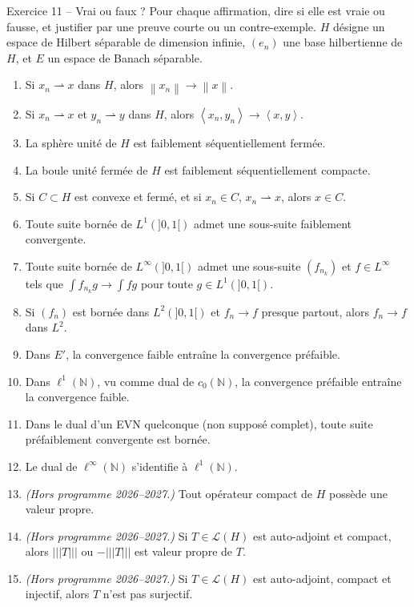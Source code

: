 \documentclass[11pt,a4paper]{article}
\newcommand{\N}{\mathbb{N}}
\newcommand{\norm}[1]{\left\|#1\right\|}
\newcommand{\opnorm}[1]{|\!|\!|#1|\!|\!|}
\newcommand{\ps}[2]{\left\langle #1,#2\right\rangle}
\newcommand{\Lc}{\mathcal{L}}
\newcommand{\wk}{\rightharpoonup}
\theoremstyle{definition}
\begin{document}
\begin{exo}{Exercice 11 -- Vrai ou faux ?}
Pour chaque affirmation, dire si elle est vraie ou fausse, et justifier par une preuve courte ou un contre-exemple. $H$ désigne un espace de Hilbert séparable de dimension infinie, $(e_n)$ une base hilbertienne de $H$, et $E$ un espace de Banach séparable.
\begin{enumerate}[label=\arabic*.]
  \item Si $x_n\wk x$ dans $H$, alors $\norm{x_n}\to\norm x$.
  \item Si $x_n\wk x$ et $y_n\wk y$ dans $H$, alors $\ps{x_n}{y_n}\to\ps xy$.
  \item La sphère unité de $H$ est faiblement séquentiellement fermée.
  \item La boule unité fermée de $H$ est faiblement séquentiellement compacte.
  \item Si $C\subset H$ est convexe et fermé, et si $x_n\in C$, $x_n\wk x$, alors $x\in C$.
  \item Toute suite bornée de $L^1(]0,1[)$ admet une sous-suite faiblement convergente.
  \item Toute suite bornée de $L^\infty(]0,1[)$ admet une sous-suite $(f_{n_k})$ et $f\in L^\infty$ tels que $\int f_{n_k}g\to\int fg$ pour toute $g\in L^1(]0,1[)$.
  \item Si $(f_n)$ est bornée dans $L^2(]0,1[)$ et $f_n\to f$ presque partout, alors $f_n\to f$ dans $L^2$.
  \item Dans $E'$, la convergence faible entraîne la convergence préfaible.
  \item Dans $\ell^1(\N)$, vu comme dual de $c_0(\N)$, la convergence préfaible entraîne la convergence faible.
  \item Dans le dual d'un EVN quelconque (non supposé complet), toute suite préfaiblement convergente est bornée.
  \item Le dual de $\ell^\infty(\N)$ s'identifie à $\ell^1(\N)$.
  \item \emph{(Hors programme 2026--2027.)} Tout opérateur compact de $H$ possède une valeur propre.
  \item \emph{(Hors programme 2026--2027.)} Si $T\in\Lc(H)$ est auto-adjoint et compact, alors $\opnorm T$ ou $-\opnorm T$ est valeur propre de $T$.
  \item \emph{(Hors programme 2026--2027.)} Si $T\in\Lc(H)$ est auto-adjoint, compact et injectif, alors $T$ n'est pas surjectif.
\end{enumerate}
\end{exo}
\end{document}
